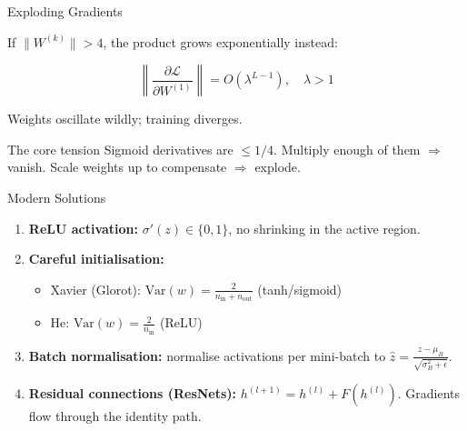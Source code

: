 \documentclass[aspectratio=169, professionalfonts]{beamer}
\begin{document}
\begin{frame}{Exploding Gradients}

If $\|W^{(k)}\| > 4$, the product grows exponentially instead:

$$\left\|\frac{\partial\mathcal{L}}{\partial W^{(1)}}\right\|
  = O(\lambda^{L-1}), \quad \lambda > 1$$

\bigskip

Weights oscillate wildly; training diverges.

\bigskip

\begin{alertblock}{The core tension}
Sigmoid derivatives are $\le 1/4$.
Multiply enough of them $\Rightarrow$ vanish.
Scale weights up to compensate $\Rightarrow$ explode.
\end{alertblock}

\end{frame}

\begin{frame}{Modern Solutions}

\begin{enumerate}
  \item \textbf{ReLU activation:}
    $\sigma'(z) \in \{0,1\}$, no shrinking in the active region.

  \bigskip

  \item \textbf{Careful initialisation:}
    \begin{itemize}
      \item Xavier (Glorot):
        $\text{Var}(w) = \frac{2}{n_{\text{in}}+n_{\text{out}}}$
        \quad(tanh/sigmoid)
      \item He:
        $\text{Var}(w) = \frac{2}{n_{\text{in}}}$
        \quad(ReLU)
    \end{itemize}

  \bigskip

  \item \textbf{Batch normalisation:}
    normalise activations per mini-batch to
    $\hat z = \frac{z-\mu_B}{\sqrt{\sigma_B^2+\epsilon}}$.

  \bigskip

  \item \textbf{Residual connections (ResNets):}
    $h^{(l+1)} = h^{(l)} + F(h^{(l)})$.
    Gradients flow through the identity path.
\end{enumerate}

\end{frame}
\end{document}
